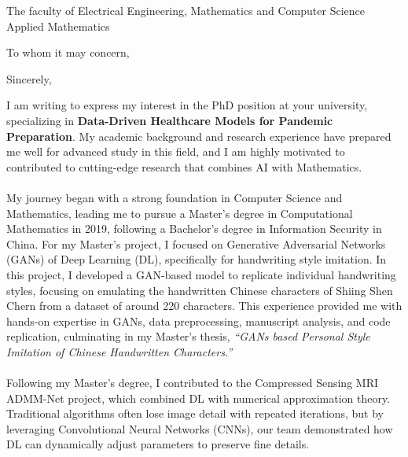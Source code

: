 \documentclass[11pt,a4paper, final]{moderncv}
\begin{document}
{The faculty of Electrical Engineering, Mathematics and Computer Science \\ 
Applied Mathematics}
\date{\today}
\opening{To whom it may concern,}
\closing{Sincerely,}
\makelettertitle
I am writing to express my interest in the PhD position at your university, 
specializing in \textbf{Data-Driven Healthcare Models for Pandemic Preparation}. 
My academic background and research experience have prepared me well for advanced study in this field, 
and I am highly motivated to contributed to cutting-edge research that combines AI with Mathematics. 
\ \\
\ \\
My journey began with a strong foundation in Computer Science and Mathematics, 
leading me to pursue a Master's degree in Computational Mathematics in 2019, 
following a Bachelor's degree in Information Security in China. 
For my Master's project, I focused on Generative Adversarial Networks (GANs) of Deep Learning (DL), 
specifically for handwriting style imitation. 
In this project, I developed a GAN-based model to replicate individual handwriting styles, 
focusing on emulating the handwritten Chinese characters of Shiing Shen Chern from a dataset of around 220 characters. 
This experience provided me with hands-on expertise in GANs, 
data preprocessing, manuscript analysis, and code replication, 
culminating in my Master's thesis, \emph{“GANs based Personal Style Imitation of Chinese Handwritten Characters.”}
\ \\
\ \\
Following my Master's degree, 
I contributed to the Compressed Sensing MRI ADMM-Net project, 
which combined DL with numerical approximation theory. 
Traditional algorithms often lose image detail with repeated iterations, 
but by leveraging Convolutional Neural Networks (CNNs), 
our team demonstrated how DL can dynamically adjust parameters to preserve fine details. 
\end{document}
